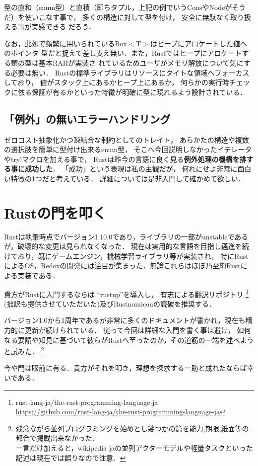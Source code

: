 型の直和（enum型）と直積（即ちタプル，上記の例でいうConsやNodeがそうだ）を使いこなす事で，
多くの構造に対して型を付け，
安全に無駄なく取り扱える事が実感できる
だろう．

なお，此処で頻繁に用いられているBox$<$T$>$はヒープにアロケートした値へのポインタ
型だと捉えて差し支え無い．また，Rustではヒープにアロケートする類の型は基本RAIIが実装さ
れているためユーザがメモリ解放について気にする必要は無い．
Rustの標準ライブラリはリソースにタイトな領域へフォーカスしており，
値がスタック上にあるかヒープ上にあるか，
何らかの実行時チェックに依る保証が有るかといった特徴が明確に型に現れるよう設計されている．

\subsection{「例外」の無いエラーハンドリング}
ゼロコスト抽象化かつ疎結合な制約としてのトレイト，
あらかたの構造や複数の選択肢を簡単に型付け出来るenum型，
そこへ今回説明しなかったイテレータやtry!マクロを加える事で，
Rustは昨今の言語に良く見る\textbf{例外処理の機構を排する事に成功した}．
「成功」という表現は私の主観だが，
何れにせよ非常に面白い特徴の1つだと考えている．
詳細については是非入門して確かめて欲しい．

\section{Rustの門を叩く}
Rustは執筆時点でバージョン1.10.0であり，ライブラリの一部がunstableであるが，破壊的な変更は見られなくなった．
現在は実用的な言語を目指し邁進を続けており，既にゲームエンジン，機械学習ライブラリ等が実装され，
特にRustによるOS，Redoxの開発には注目が集まった．無論これらはほぼ乃至純Rustによる実装である．

貴方がRustに入門するならば ``rustup''を導入し，
有志による翻訳リポジトリ
\footnote{rust-lang-ja/the-rust-programming-language-ja \\
  \url{https://github.com/rust-lang-ja/the-rust-programming-language-ja}}
(拙訳も提供させていただいた)及びRustnomiconの読破を推奨する．

バージョン1.0から1周年であるが非常に多くのドキュメントが書かれ，現在も精力的に更新が続けられている．
従って今回は詳細な入門を書く事は避け，
如何なる要請や知見に基づいて彼らがRustへ至ったのか，その道筋の一端を述べようと試みた．
\footnote{残念ながら並列プログラミングを始めとし幾つかの篇を能力,期限,紙面等の都合で掲載出来なかった．
  \\ 一言だけ加えると，wikipedia jaの並列アクターモデルや軽量タスクといった記述は現在では誤りなので注意．}

今や門は眼前に有る．貴方がそれを叩き，理想を探求する一助と成れたならば幸いである．
